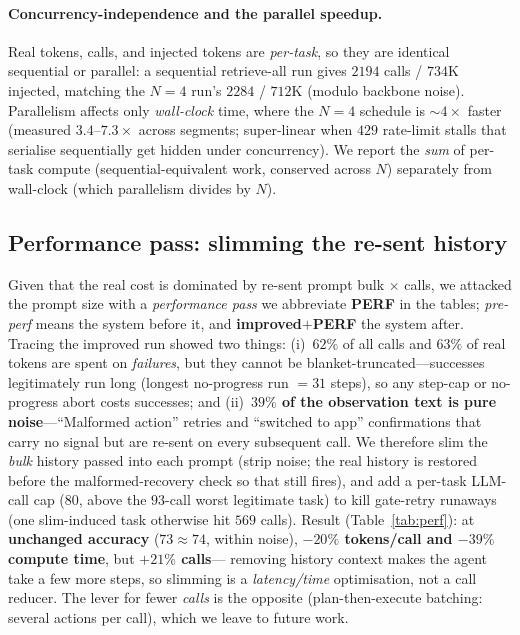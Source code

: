 \documentclass[10pt,twocolumn]{article}
\begin{document}
\paragraph{Concurrency-independence and the parallel speedup.} Real tokens, calls, and injected
tokens are \emph{per-task}, so they are identical sequential or parallel: a sequential retrieve-all
run gives $2194$ calls / $734$K injected, matching the $N{=}4$ run's $2284$ / $712$K (modulo backbone
noise). Parallelism affects only \emph{wall-clock} time, where the $N{=}4$ schedule is $\sim$$4\times$
faster (measured $3.4$--$7.3\times$ across segments; super-linear when $429$ rate-limit stalls that
serialise sequentially get hidden under concurrency). We report the \emph{sum} of per-task compute
(sequential-equivalent work, conserved across $N$) separately from wall-clock (which parallelism
divides by $N$).

\subsection{Performance pass: slimming the re-sent history}\label{sec:perfpass}
Given that the real cost is dominated by re-sent prompt bulk $\times$ calls, we attacked the prompt
size with a \emph{performance pass} we abbreviate \textbf{PERF} in the tables; \emph{pre-perf} means
the system before it, and \textbf{improved$+$PERF} the system after.
Tracing the improved run showed two things: (i)~$62\%$ of all calls and $63\%$ of real tokens
are spent on \emph{failures}, but they cannot be blanket-truncated---successes legitimately run long
(longest no-progress run $=31$ steps), so any step-cap or no-progress abort costs successes; and
(ii)~\textbf{$39\%$ of the observation text is pure noise}---``Malformed action'' retries and
``switched to app'' confirmations that carry no signal but are re-sent on every subsequent call.
We therefore slim the \emph{bulk} history passed into each prompt (strip noise; the real history is
restored before the malformed-recovery check so that still fires), and add a per-task LLM-call cap
($80$, above the $93$-call worst legitimate task) to kill gate-retry runaways (one slim-induced task
otherwise hit $569$ calls). Result (Table~\ref{tab:perf}): at \textbf{unchanged accuracy} ($73{\approx}74$,
within noise), \textbf{$-20\%$ tokens/call and $-39\%$ compute time}, but \textbf{$+21\%$ calls}---
removing history context makes the agent take a few more steps, so slimming is a \emph{latency/time}
optimisation, not a call reducer. The lever for fewer \emph{calls} is the opposite (plan-then-execute
batching: several actions per call), which we leave to future work.
\end{document}
